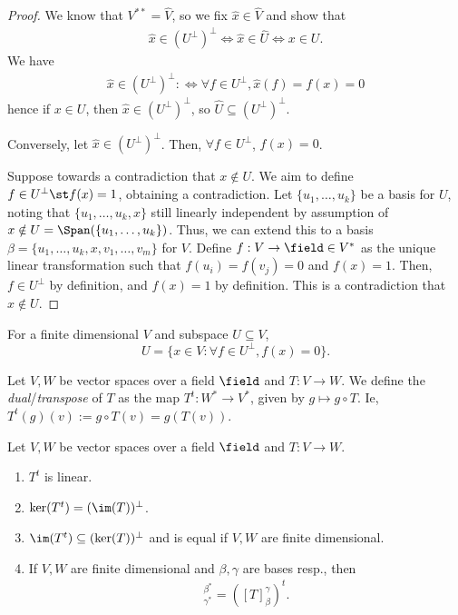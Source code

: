 \begin{proof}
    We know that $V^{\ast \ast} = \hat{V}$, so we fix $\hat{x} \in \hat{V}$ and show that \begin{align*}
        \hat{x} \in (U^\perp)^\perp \iff \hat{x} \in \hat {U} \iff x \in U.
    \end{align*}
We have 
    \begin{align*}
        \hat{x} \in (U^\perp)^\perp :\iff \forall f \in U^\perp, \hat{x}(f) = f(x) = 0
    \end{align*}
    hence if $x \in U$, then $\hat{x} \in (U^\perp)^\perp$, so $\hat{U} \subseteq (U^\perp)^\perp$.

    Conversely, let $\hat{x} \in (U^\perp)^\perp$. Then, $\forall f \in U^\perp$, $f(x) = 0$.
    
    Suppose towards a contradiction that $x \notin U$. We aim to define $f \in U^\perp \st f(x) = 1$, obtaining a contradiction. Let $\{u_1, \dots, u_k\}$ be a basis for $U$, noting that $\{u_1, \dots, u_k, x\}$ still linearly independent by assumption of $x \notin U = \Span(\{u_1, \dots, u_k\})$. Thus, we can extend this to a basis $\beta = \{u_1, \dots, u_k, x, v_1, \dots, v_m\}$ for $V$. Define $f :V \to \field \in V^\ast$ as the unique linear transformation such that $f(u_i) = f(v_j) = 0$ and $f(x) = 1$. Then, $f \in U^\perp$ by definition, and $f(x) = 1$ by definition. This is a contradiction that $x \notin U$.
\end{proof}

\begin{corollary}
    For a finite dimensional $V$ and subspace $U \subseteq V$,
    \[
    U = \{x \in V : \forall f \in U^\perp, f(x) = 0\}.
    \]
\end{corollary}

\begin{definition}
    Let $V, W$ be vector spaces over a field $\field$ and $T : V \to W$. We define the \emph{dual}/\emph{transpose} of $T$ as the map $T^t : W^\ast \to V^\ast$, given by $g \mapsto g\circ T$. Ie, $T^t(g)(v) := g \circ T(v) = g(T(v))$.
\end{definition}

\begin{proposition}\label{prop:propertiesoftranspose}
    Let $V, W$ be vector spaces over a field $\field$ and $T : V \to W$. \begin{enumerate}
        \item $T^t$ is linear.
        \item $\ker(T^t) = (\im(T))^\perp$.
        \item $\im(T^t) \subseteq (\ker(T))^\perp$ and is equal if $V, W$ are finite dimensional.
        \item If $V,W$ are finite dimensional and $\beta, \gamma$ are bases resp., then \begin{align*}
            [T^t]_{\gamma^\ast}^{\beta^\ast} = ([T]_\beta^\gamma)^t.
        \end{align*}
    \end{enumerate}
\end{proposition}

